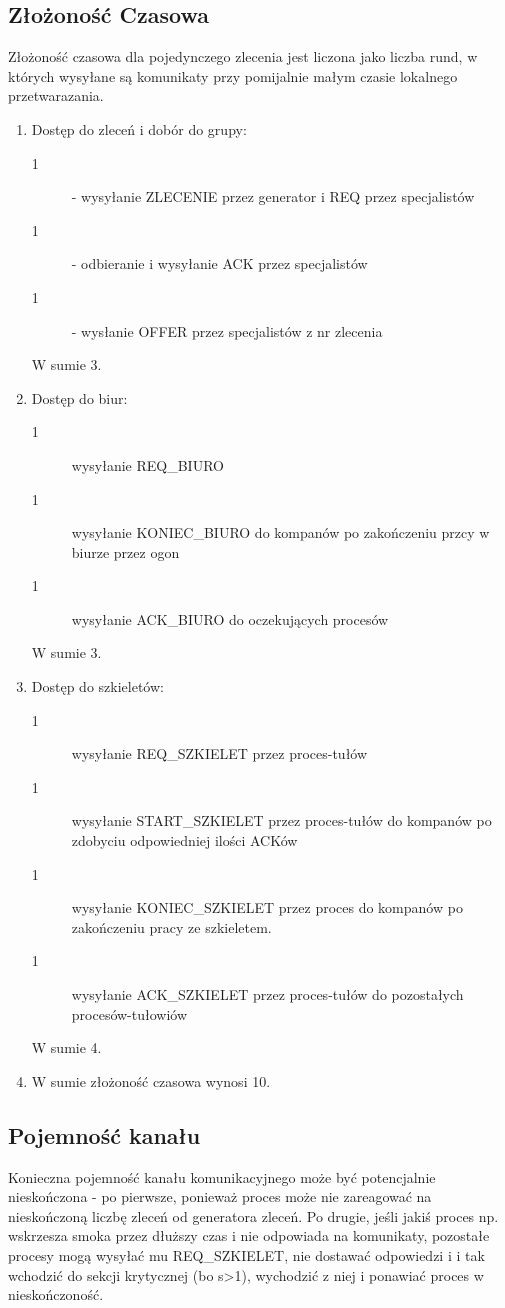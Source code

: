 \documentclass[12pt]{article}
\begin{document}
\subsection{Złożoność Czasowa}
Złożoność czasowa dla pojedynczego zlecenia jest liczona jako liczba rund, w których wysyłane są komunikaty przy pomijalnie małym czasie lokalnego przetwarazania.
\begin{enumerate}
	\item Dostęp do zleceń i dobór do grupy:
	\begin{description}
		\item[1] - wysyłanie ZLECENIE przez generator i REQ przez specjalistów
		\item[1] - odbieranie i wysyłanie ACK przez specjalistów
		\item[1] - wysłanie OFFER przez specjalistów z nr zlecenia
	\end{description}
	W sumie 3.
	
	\item Dostęp do biur:
	\begin{description}
		\item[1] wysyłanie REQ\_BIURO
		\item[1] wysyłanie KONIEC\_BIURO do kompanów po zakończeniu przcy w biurze przez ogon
		\item[1] wysyłanie ACK\_BIURO do oczekujących procesów
	\end{description}
	W sumie 3.
	
	\item Dostęp do szkieletów:
	\begin{description}
		\item[1] wysyłanie REQ\_SZKIELET przez proces-tułów
		\item[1] wysyłanie START\_SZKIELET przez proces-tułów do kompanów po zdobyciu odpowiedniej ilości ACKów
		\item[1] wysyłanie KONIEC\_SZKIELET przez proces do kompanów po zakończeniu pracy ze szkieletem.
		\item[1] wysyłanie ACK\_SZKIELET przez proces-tułów do pozostałych procesów-tułowiów
	\end{description}
	W sumie 4.
	\item W sumie złożoność czasowa wynosi 10.
\end{enumerate}

\subsection{Pojemność kanału}
Konieczna pojemność kanału komunikacyjnego może być potencjalnie nieskończona - po pierwsze, ponieważ proces może nie zareagować na nieskończoną liczbę zleceń od generatora zleceń. Po drugie, jeśli jakiś proces np. wskrzesza smoka przez dłuższy czas i nie odpowiada na komunikaty, pozostałe procesy mogą wysyłać mu REQ\_SZKIELET, nie dostawać odpowiedzi i i tak wchodzić do sekcji krytycznej (bo s>1), wychodzić z niej i ponawiać proces w nieskończoność. 
\end{document}
